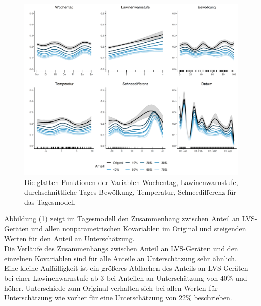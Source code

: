 \documentclass[12pt]{scrreprt}
\begin{document}
\begin{figure}[H]
	\centering
	\includegraphics[width=\linewidth]{plots/day_model_general_comparison}
	\caption{ Die glatten Funktionen der Variablen Wochentag, Lawinenwarnstufe, durchschnittliche Tages-Bewölkung, Temperatur, Schneedifferenz für das Tagesmodell}
	\label{pic:day_model_general_comparison}	
\end{figure}
\noindent Abbildung (\ref{pic:day_model_general_comparison}) zeigt im Tagesmodell den Zusammenhang zwischen Anteil an LVS-Geräten und allen nonparametrischen Kovariablen im Original und steigenden Werten für den Anteil an Unterschätzung. \\
Die Verläufe des Zusammenhangs zwischen Anteil an LVS-Geräten und den einzelnen Kovariablen sind für alle Anteile an Unterschätzung sehr ähnlich. \\
Eine kleine Auffälligkeit ist ein größeres Abflachen des Anteils an LVS-Geräten bei einer Lawinenwarnstufe ab 3 bei Anteilen an Unterschätzung von 40\% und höher. Unterschiede zum Original verhalten sich bei allen Werten für Unterschätzung wie vorher für eine Unterschätzung von 22\% beschrieben.
\end{document}

